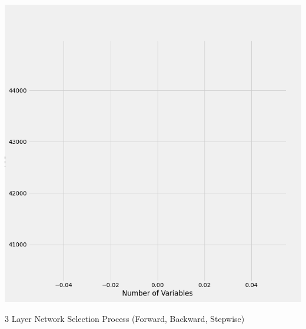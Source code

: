 \documentclass{article}
\begin{document}
	\includegraphics[scale = 0.2]{../plots/python/AICStepwisePCP.png}
	
	3 Layer Network Selection Process (Forward, Backward, Stepwise)
	
\end{document}
